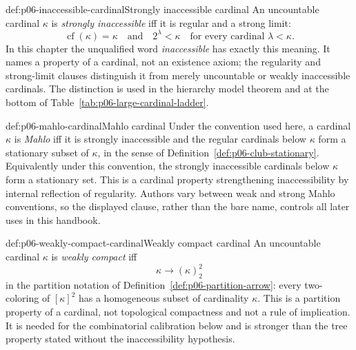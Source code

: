 \begin{hbdefinition}{def:p06-inaccessible-cardinal}{Strongly inaccessible cardinal}
An uncountable cardinal \(\kappa\) is \emph{strongly inaccessible} iff it is
regular and a strong limit:
\[
  \operatorname{cf}(\kappa)=\kappa
  \quad\text{and}\quad
  2^\lambda<\kappa\quad\text{for every cardinal }\lambda<\kappa.
\]
In this chapter the unqualified word \emph{inaccessible} has exactly this
meaning.  It names a property of a cardinal, not an existence axiom; the
regularity and strong-limit clauses distinguish it from merely uncountable or
weakly inaccessible cardinals.  The distinction is used in the hierarchy
model theorem and at the bottom of Table~\ref{tab:p06-large-cardinal-ladder}.
\end{hbdefinition}

\begin{hbdefinition}{def:p06-mahlo-cardinal}{Mahlo cardinal}
Under the convention used here, a cardinal \(\kappa\) is \emph{Mahlo} iff it
is strongly inaccessible and the regular cardinals below \(\kappa\) form a
stationary subset of \(\kappa\), in the sense of
Definition~\ref{def:p06-club-stationary}.  Equivalently under this convention,
the strongly inaccessible cardinals below \(\kappa\) form a stationary set.
This is a cardinal property strengthening inaccessibility by internal
reflection of regularity.  Authors vary between weak and strong Mahlo
conventions, so the displayed clause, rather than the bare name, controls all
later uses in this handbook.
\end{hbdefinition}

\begin{hbdefinition}{def:p06-weakly-compact-cardinal}{Weakly compact cardinal}
An uncountable cardinal \(\kappa\) is \emph{weakly compact} iff
\[
  \kappa\longrightarrow(\kappa)^2_2
\]
in the partition notation of Definition~\ref{def:p06-partition-arrow}: every
two-coloring of \([\kappa]^2\) has a homogeneous subset of cardinality
\(\kappa\).  This is a partition property of a cardinal, not topological
compactness and not a rule of implication.  It is needed for the combinatorial
calibration below and is stronger than the tree property stated without the
inaccessibility hypothesis.
\end{hbdefinition}

